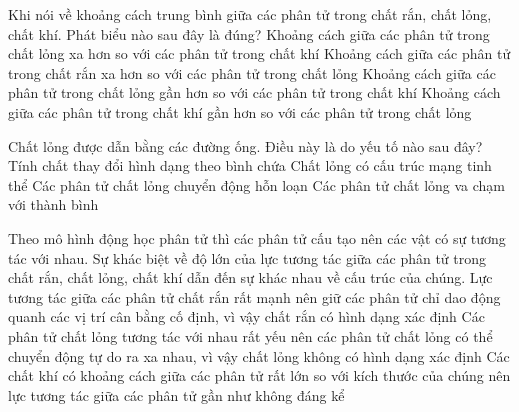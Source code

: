 \begin{ex}%
	Khi nói về khoảng cách trung bình giữa các phân tử trong chất rắn, chất lỏng, chất khí. Phát biểu nào sau đây là đúng?
	\choice
	{Khoảng cách giữa các phân tử trong chất lỏng xa hơn so với các phân tử trong chất khí}
	{Khoảng cách giữa các phân tử trong chất rắn xa hơn so với các phân tử trong chất lỏng}
	{\True Khoảng cách giữa các phân tử trong chất lỏng gần hơn so với các phân tử trong chất khí}
	{Khoảng cách giữa các phân tử trong chất khí gần hơn so với các phân tử trong chất lỏng}
\end{ex}
\begin{ex}%
	Chất lỏng được dẫn bằng các đường ống. Điều này là do yếu tố nào sau đây?
	\choice
	{\True Tính chất thay đổi hình dạng theo bình chứa}
	{Chất lỏng có cấu trúc mạng tinh thể}
	{Các phân tử chất lỏng chuyển động hỗn loạn} 
	{Các phân tử chất lỏng va chạm với thành bình}
\end{ex}
\begin{ex}%
	Theo mô hình động học phân tử thì các phân tử cấu tạo nên các vật có sự tương tác với nhau. Sự khác biệt về độ lớn của lực tương tác giữa các phân tử trong chất rắn, chất lỏng, chất khí dẫn đến sự khác nhau về cấu trúc của chúng.
	{\True Lực tương tác giữa các phân tử chất rắn rất mạnh nên giữ các phân tử chỉ dao động quanh các vị trí cân bằng cố định, vì vậy chất rắn có hình dạng xác định}
	{Các phân tử chất lỏng tương tác với nhau rất yếu nên các phân tử chất lỏng có thể chuyển động tự do ra xa nhau, vì vậy chất lỏng không có hình dạng xác định}
	{Các chất khí có khoảng cách giữa các phân tử rất lớn so với kích thước của chúng nên lực tương tác giữa các phân tử gần như không đáng kể}
\end{ex}
